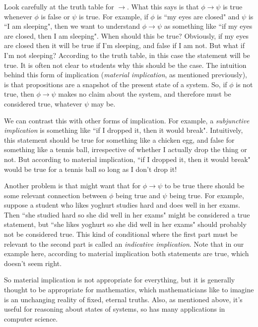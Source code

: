 \documentclass{article}
\theoremstyle{plain}
\newcommand{\ra}{\rightarrow}
\begin{document}
Look carefully at the truth table for $\ra$. What this says is that $\phi\ra\psi$ is true whenever $\phi$ is false or $\psi$ is true. For example, if $\phi$ is ``my eyes are closed" and $\psi$ is ``I am sleeping", then we want to understand $\phi\ra\psi$ as something like ``if my eyes are closed, then I am sleeping". When should this be true? Obviously, if my eyes are closed then it will be true if I'm sleeping, and false if I am not. But what if I'm not sleeping? According to the truth table, in this case the statement will be true. It is often not clear to students why this should be the case. The intuition behind this form of implication (\emph{material implication}, as mentioned previously), is that propositions are a snapshot of the present state of a system. So, if $\phi$ is not true, then $\phi\ra \psi$ makes no claim about the system, and therefore must be considered true, whatever $\psi$ may be. 

We can contrast this with other forms of implication. For example, a \emph{subjunctive implication} is something like ``if I dropped it, then it would break". Intuitively, this statement should be true for something like a chicken egg, and false for something like a tennis ball, irrespective of whether I actually drop the thing or not. But according to material implication, ``if I dropped it, then it would break" would be true for a tennis ball so long as I don't drop it! 

Another problem is that might want that for $\phi\ra \psi$ to be true there should be some relevant connection between $\phi$ being true and $\psi$ being true. For example, suppose a student who likes yoghurt studies hard and does well in her exams. Then ``she studied hard so she did well in her exams" might be considered a true statement, but ``she likes yoghurt so she did well in her exams" should probably not be considered true. This kind of conditional where the first part must be relevant to the second part is called an \emph{indicative implication}. Note that in our example here, according to material implication both statements are true, which doesn't seem right. 

So material implication is not appropriate for everything, but it is generally thought to be appropriate for mathematics, which mathematicians like to imagine is an unchanging reality of fixed, eternal truths. Also, as mentioned above, it's useful for reasoning about states of systems, so has many applications in computer science.
\end{document}
